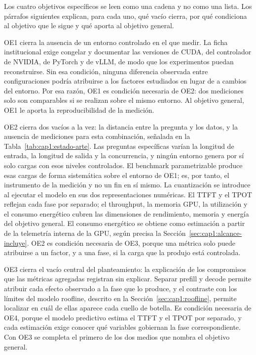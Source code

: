 Los cuatro objetivos específicos se leen como una cadena y no como una lista. Los párrafos siguientes explican, para cada uno, qué vacío cierra, por qué condiciona al objetivo que le sigue y qué aporta al objetivo general.

OE1 cierra la ausencia de un entorno controlado en el que medir. La ficha institucional exige congelar y documentar las versiones de CUDA, del controlador de NVIDIA, de PyTorch y de vLLM, de modo que los experimentos puedan reconstruirse. Sin esa condición, ninguna diferencia observada entre configuraciones podría atribuirse a los factores estudiados en lugar de a cambios del entorno. Por esa razón, OE1 es condición necesaria de OE2: dos mediciones solo son comparables si se realizan sobre el mismo entorno. Al objetivo general, OE1 le aporta la reproducibilidad de la medición.

OE2 cierra dos vacíos a la vez: la distancia entre la pregunta y los datos, y la ausencia de mediciones para esta combinación, señalada en la Tabla~\ref{tab:cap1:estado-arte}. Las preguntas específicas varían la longitud de entrada, la longitud de salida y la concurrencia, y ningún entorno genera por sí solo cargas con esos niveles controlados. El benchmark parametrizable produce esas cargas de forma sistemática sobre el entorno de OE1; es, por tanto, el instrumento de la medición y no un fin en sí mismo. La cuantización se introduce al ejecutar el modelo en sus dos representaciones numéricas. El TTFT y el TPOT reflejan cada fase por separado; el throughput, la memoria GPU, la utilización y el consumo energético cubren las dimensiones de rendimiento, memoria y energía del objetivo general. El consumo energético se obtiene como estimación a partir de la telemetría interna de la GPU, según precisa la Sección~\ref{sec:cap1:alcance-incluye}. OE2 es condición necesaria de OE3, porque una métrica solo puede atribuirse a un factor, y a una fase, si la carga que la produjo está controlada.

OE3 cierra el vacío central del planteamiento: la explicación de los compromisos que las métricas agregadas registran sin explicar. Separar prefill y decode permite atribuir cada efecto observado a la fase que lo produce, y el contraste con los límites del modelo roofline, descrito en la Sección~\ref{sec:cap1:roofline}, permite localizar en cuál de ellas aparece cada cuello de botella. Es condición necesaria de OE4, porque el modelo predictivo estima el TTFT y el TPOT por separado, y cada estimación exige conocer qué variables gobiernan la fase correspondiente. Con OE3 se completa el primero de los dos medios que nombra el objetivo general.


